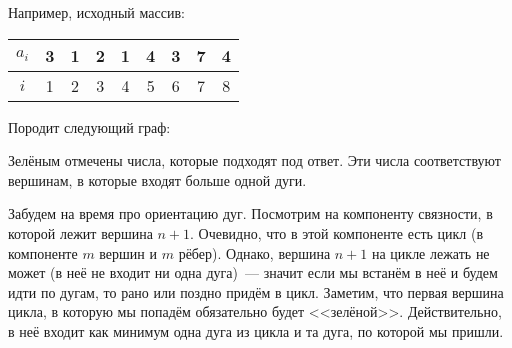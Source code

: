 \documentclass[addpoints]{exam}
\begin{document}
\begin{questions}
\begin{solution}
Например, исходный массив:

\begin{center}

\begin{tabular}{|c|c|c|c|c|c|c|c|c|}
\hline 
$a_i$ & 3 & 1 & 2 & 1 & 4 & 3 & 7 & 4 \\ 
\hline 
$i$ & 1 & 2 & 3 & 4 & 5 & 6 & 7 & 8 \\ 
\hline 
\end{tabular} 

\end{center}

Породит следующий граф:

\begin{center}


\end{center}

Зелёным отмечены числа, которые подходят под ответ. Эти числа соответствуют вершинам, в которые входят больше одной дуги.

Забудем на время про ориентацию дуг. Посмотрим на компоненту связности, в которой лежит вершина $n+1$. Очевидно, что в этой компоненте есть цикл (в компоненте $m$ вершин и $m$ рёбер). Однако, вершина $n+1$ на цикле лежать не может (в неё не входит ни одна дуга)~--- значит если мы встанём в неё и будем идти по дугам, то рано или поздно придём в цикл. Заметим, что первая вершина цикла, в которую мы попадём обязательно будет <<зелёной>>. Действительно, в неё входит как минимум одна дуга из цикла и та дуга, по которой мы пришли.


\end{solution}
\end{questions}
\end{document}
